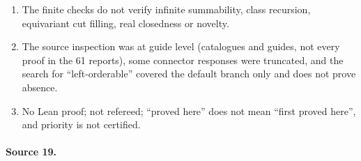 \documentclass[11pt,oneside]{article}
\numberwithin{equation}{section}
\theoremstyle{definition}
\theoremstyle{remark}
\begin{document}
\begin{enumerate}[itemsep=1pt]
classification; its questions are directions, not published problems.
\item The finite checks do not verify infinite summability, class recursion, equivariant cut filling, real closedness or novelty.
\item The source inspection was at guide level (catalogues and guides, not every proof in the 61 reports), some connector responses were
truncated, and the search for ``left-orderable'' covered the default branch only and does not prove absence.
\item No Lean proof; not refereed; ``proved here'' does not mean ``first proved here'', and priority is not certified.
\end{enumerate}

\paragraph{Source 19.}
\end{document}
